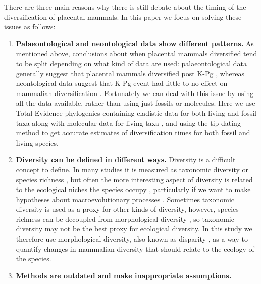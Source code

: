 \documentclass[12pt,letterpaper]{article}
\begin{document}
There are three main reasons why there is still debate about the timing of the diversification of placental mammals. In this paper we focus on solving these issues as follows: %
  \begin{enumerate}
    \item \textbf{Palaeontological and neontological data show different patterns.}
    As mentioned above, conclusions about when placental mammals diversified tend to be split depending on what kind of data are used: palaeontological data generally suggest that placental mammals diversified post K-Pg \citep[e.g.][]{O'Leary08022013}, whereas neontological data suggest that K-Pg event had little to no effect on mammalian diversification \citep{bininda2007delayed,meredithimpacts2011,Stadler12042011}. 
    Fortunately we can deal with this issue by using all the data available, rather than using just fossils or molecules. 
    Here we use Total Evidence phylogenies containing cladistic data for both living and fossil taxa along with molecular data for living taxa \citep{eernissetaxonomic1993,ronquista2012}, and using the tip-dating method \citep{ronquista2012,Wood01032013} to get accurate estimates of diversification times for both fossil and living species.
    \item \textbf{Diversity can be defined in different ways.}
    Diversity is a difficult concept to define. 
    In many studies it is measured as taxonomic diversity or species richness \citep{Stadler12042011,meredithimpacts2011,O'Leary08022013}, but often the more interesting aspect of diversity is related to the ecological niches the species occupy \citep{Wesley-Hunt2005,Brusatte12092008,toljagictriassic-jurassic2013}, particularly if we want to  make hypotheses about macroevolutionary processes \citep{Pearman2008149,OlsonRadiation,Losos2010,glor2010phylogenetic}.
    Sometimes taxonomic diversity is used as a proxy for other kinds of diversity, however, species richness can be decoupled from morphological diversity \citep{slaterCetacean,ruta2013,hopkinsdecoupling2013}, so taxonomic diversity may not be the best proxy for ecological diversity.
    In this study we therefore use morphological diversity, also known as disparity \citep[e.g.][]{Wills1994,Hughes20082013},
    as a way to quantify changes in mammalian diversity that should relate to the ecology of the species.
    \item \textbf{Methods are outdated and make inappropriate assumptions.}

\end{enumerate}
\end{document}
